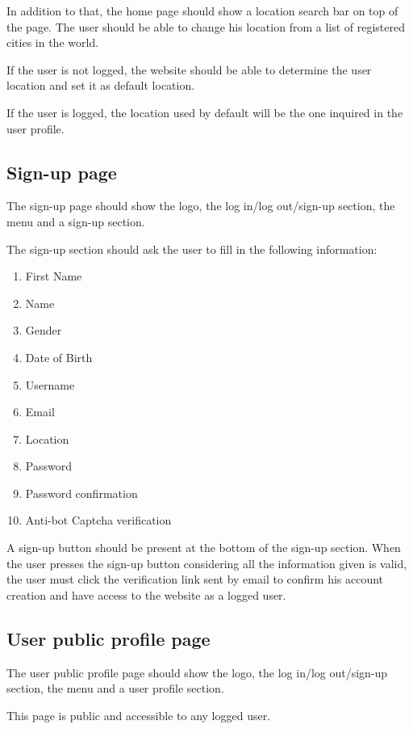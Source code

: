 \documentclass[conference]{IEEEtran}
\begin{document}
In addition to that, the home page should show a location search bar on top of the page.
The user should be able to change his location from a list of registered cities in the world.

If the user is not logged, the website should be able to determine the user location and set it as default location.

If the user is logged, the location used by default will be the one inquired in the user profile.

\subsection{Sign-up page}

The sign-up page should show the logo, the log in/log out/sign-up section, the menu and a sign-up section.

The sign-up section should ask the user to fill in the following information:

\begin{enumerate}
    \item First Name
    \item Name
    \item Gender
    \item Date of Birth
    \item Username
    \item Email
    \item Location
    \item Password
    \item Password confirmation
    \item Anti-bot Captcha verification
\end{enumerate}

A sign-up button should be present at the bottom of the sign-up section.
When the user presses the sign-up button considering all the information given is valid, the user must click the verification link sent by email to confirm his account creation and have access to the website as a logged user.

\subsection{User public profile page}

The user public profile page should show the logo, the log in/log out/sign-up section, the menu and a user profile section.

This page is public and accessible to any logged user.
\end{document}
